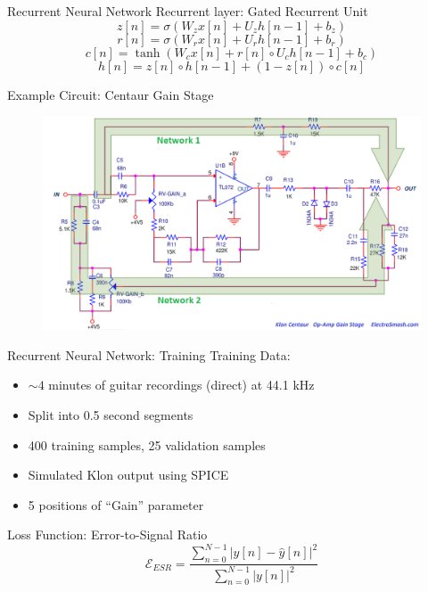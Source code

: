\begin{frame}{Recurrent Neural Network}
    Recurrent layer: Gated Recurrent Unit
    \begin{equation}
        z[n] = \sigma(W_z x[n] + U_z h[n-1] + b_z)
    \end{equation}
    \begin{equation}
        r[n] = \sigma(W_r x[n] + U_r h[n-1] + b_r)
    \end{equation}
    \begin{equation}
        c[n] = \tanh(W_c x[n] + r[n] \circ U_c h[n-1] + b_c)
    \end{equation}
    \begin{equation}
        h[n] = z[n] \circ h[n-1] + (1 - z[n]) \circ c[n]
    \end{equation}
\end{frame}

\begin{frame}{Example Circuit: Centaur Gain Stage}
    \begin{figure}
        \centering
        \includegraphics[height=2.5in]{../Paper/Figures/GainStageCircuit.png}
    \end{figure}
\end{frame}

\begin{frame}{Recurrent Neural Network: Training}
    Training Data:
    \begin{itemize}
        \itemsep0em
        \item $\sim 4$ minutes of guitar recordings (direct) at 44.1 kHz
        \item Split into 0.5 second segments
        \item 400 training samples, 25 validation samples
        \item Simulated Klon output using SPICE
        \item 5 positions of ``Gain'' parameter
    \end{itemize}
    \vspace{2ex}
    Loss Function: Error-to-Signal Ratio
    \begin{equation}
        \mathcal{E}_{ESR} = \frac{\sum_{n=0}^{N-1} |y[n] - \hat{y}[n]|^2}{\sum_{n=0}^{N-1} |y[n]|^2}
    \end{equation}
\end{frame}

